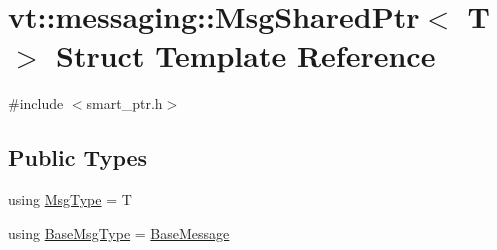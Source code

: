 \hypertarget{structvt_1_1messaging_1_1_msg_shared_ptr}{}\section{vt\+:\+:messaging\+:\+:Msg\+Shared\+Ptr$<$ T $>$ Struct Template Reference}
\label{structvt_1_1messaging_1_1_msg_shared_ptr}


{\ttfamily \#include $<$smart\+\_\+ptr.\+h$>$}

\subsection*{Public Types}
\begin{DoxyCompactItemize}
\item 
using \hyperlink{structvt_1_1messaging_1_1_msg_shared_ptr_a714463f633ada883b4fbdfd3541d30a7}{Msg\+Type} = T
\item 
using \hyperlink{structvt_1_1messaging_1_1_msg_shared_ptr_a778cb9ec8919e4a309d28ed345ac318d}{Base\+Msg\+Type} = \hyperlink{namespacevt_ac34f95a5e2b8109b55bfba52b074443d}{Base\+Message}
\end{DoxyCompactItemize}
